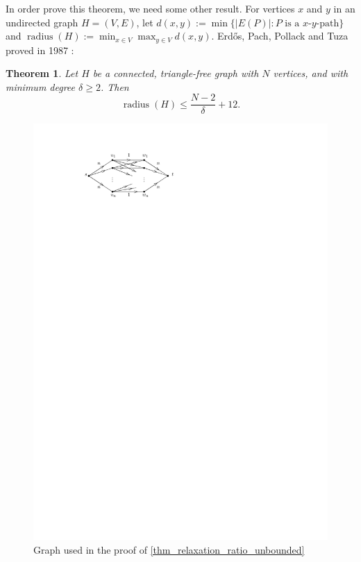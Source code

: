 \documentclass[10pt,a4paper]{article}
\newtheorem{theorem}{Theorem}[section]
\numberwithin{equation}{section}
\newcommand{\set}[1]{\{ #1 \}}
\DeclareMathOperator{\radius}{\text{radius}}
\begin{document}
In order prove this theorem, we need some other result. For vertices $x$ and $y$ in an undirected graph $H = (V, E)$, let $d(x, y) := \min\set{ |E(P)| : P \text{ is a $x$-$y$-path}}$ and $\radius(H) := \min_{x \in V} \max_{y \in V} d(x, y)$. Erd\H{o}s, Pach, Pollack and Tuza proved in 1987 \cite{erdHos1989radius}:
\begin{theorem}
\label{thm_mindegree_diameter_erdos}
Let $H$ be a connected, triangle-free graph with $N$ vertices, and with minimum degree $\delta \geq 2$. Then
\[\radius(H) \leq \frac{N-2}{\delta} + 12.\] 
\end{theorem} 
\begin{figure}[htpb]
\centering
\includegraphics[scale=1]{img/relaxation-ratio-unbounded}
\caption{Graph used in the proof of \cref{thm_relaxation_ratio_unbounded}}
\label{fig_relaxation_ratio_unbounded}
\end{figure}
\end{document}
